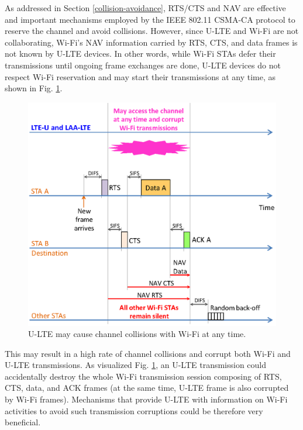 As addressed in Section \ref{collision-avoidance}, RTS/CTS and NAV are effective and important mechanisms employed by the IEEE 802.11 CSMA-CA protocol to reserve the channel and avoid collisions. However, since \mbox{U-LTE} and \mbox{Wi-Fi} are not collaborating, \mbox{Wi-Fi}'s NAV information carried by RTS, CTS, and data frames is not known by \mbox{U-LTE} devices. In other words, while \mbox{Wi-Fi} STAs defer their transmissions until ongoing frame exchanges are done, \mbox{U-LTE} devices do not respect \mbox{Wi-Fi} reservation and may start their transmissions at any time, as shown in Fig. \ref{figs:LTE-U-enhancement-RTS-CTS-NAV}.
\begin{figure}[!ht]
	\centering
	\includegraphics[width=0.7\columnwidth]{figs/LTE-U-enhancement-RTS-CTS-NAV}
	\caption{\mbox{U-LTE} may cause channel collisions with \mbox{Wi-Fi} at any time.}
	\label{figs:LTE-U-enhancement-RTS-CTS-NAV}
\end{figure}
This may result in a high rate of channel collisions and corrupt both \mbox{Wi-Fi} and \mbox{U-LTE} transmissions. As visualized Fig. \ref{figs:LTE-U-enhancement-RTS-CTS-NAV}, an \mbox{U-LTE} transmission could accidentally destroy the whole \mbox{Wi-Fi} transmission session composing of RTS, CTS, data, and ACK frames (at the same time, \mbox{U-LTE} frame is also corrupted by \mbox{Wi-Fi} frames). Mechanisms that provide \mbox{U-LTE} with information on \mbox{Wi-Fi} activities to avoid such transmission corruptions could be therefore very beneficial.

